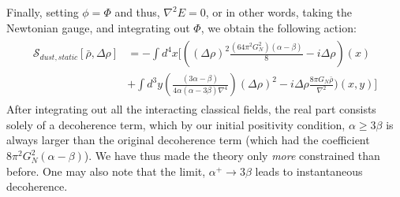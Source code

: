 \documentclass[aps,preprintnumbers,superscriptaddress,longbibliography]{revtex4-1}
\begin{document}
Finally, setting $\phi=\Phi$ and thus, $\nabla^2E=0$, or in other words, taking the Newtonian gauge, and integrating out $\Phi$, we obtain the following action:
\begin{align}
\begin{split}
\mathcal{S}_{dust,static}[\bar{\rho},\Delta\rho]&=-\int d^4x[((\Delta\rho)^2\frac{(64\pi^2G_N^2)(\alpha-\beta)}{8}-i\Delta\rho)(x)\\&+\int d^3y(\frac{(3\alpha-\beta)}{4\alpha(\alpha-3\beta)\nabla^4})(\Delta\rho)^2-i\Delta\rho\frac{8\pi G_N\bar\rho}{\nabla^2})(x,y)]
    \end{split}
\end{align}
After integrating out all the interacting classical fields, the real part consists solely of a decoherence term, which by our initial positivity condition, $\alpha\geq3\beta$ is always larger than the original decoherence term (which had the coefficient $8\pi^2 G_N^2(\alpha-\beta)$). We have thus made the theory only \textit{more} constrained than before. One may also note that the limit, $\alpha^+\rightarrow3\beta$ leads to instantaneous decoherence.
\end{document}
